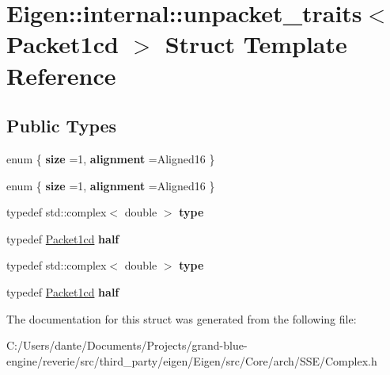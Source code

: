 \hypertarget{struct_eigen_1_1internal_1_1unpacket__traits_3_01_packet1cd_01_4}{}\section{Eigen\+::internal\+::unpacket\+\_\+traits$<$ Packet1cd $>$ Struct Template Reference}
\label{struct_eigen_1_1internal_1_1unpacket__traits_3_01_packet1cd_01_4}
\subsection*{Public Types}
\begin{DoxyCompactItemize}
\item 
\mbox{\label{struct_eigen_1_1internal_1_1unpacket__traits_3_01_packet1cd_01_4_a66a5f5be065a07046cacb29091284cc8}} 
enum \{ {\bfseries size} =1, 
{\bfseries alignment} =Aligned16
 \}
\item 
\mbox{\label{struct_eigen_1_1internal_1_1unpacket__traits_3_01_packet1cd_01_4_acfa28ce2d81356aed8ae758c8d8fef7c}} 
enum \{ {\bfseries size} =1, 
{\bfseries alignment} =Aligned16
 \}
\item 
\mbox{\label{struct_eigen_1_1internal_1_1unpacket__traits_3_01_packet1cd_01_4_a4e58df3fde2b90a2ecbfdce3fa5256be}} 
typedef std\+::complex$<$ double $>$ {\bfseries type}
\item 
\mbox{\label{struct_eigen_1_1internal_1_1unpacket__traits_3_01_packet1cd_01_4_a2ef255344983f1a9c41803df2024f0af}} 
typedef \mbox{\hyperlink{struct_eigen_1_1internal_1_1_packet1cd}{Packet1cd}} {\bfseries half}
\item 
\mbox{\label{struct_eigen_1_1internal_1_1unpacket__traits_3_01_packet1cd_01_4_a4e58df3fde2b90a2ecbfdce3fa5256be}} 
typedef std\+::complex$<$ double $>$ {\bfseries type}
\item 
\mbox{\label{struct_eigen_1_1internal_1_1unpacket__traits_3_01_packet1cd_01_4_a2ef255344983f1a9c41803df2024f0af}} 
typedef \mbox{\hyperlink{struct_eigen_1_1internal_1_1_packet1cd}{Packet1cd}} {\bfseries half}
\end{DoxyCompactItemize}


The documentation for this struct was generated from the following file\+:\begin{DoxyCompactItemize}
\item 
C\+:/\+Users/dante/\+Documents/\+Projects/grand-\/blue-\/engine/reverie/src/third\+\_\+party/eigen/\+Eigen/src/\+Core/arch/\+S\+S\+E/Complex.\+h\end{DoxyCompactItemize}

